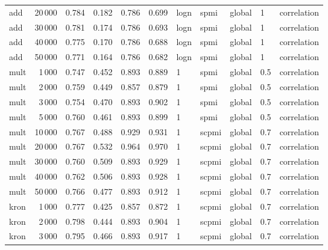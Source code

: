 \begin{tabular}{lrrrrrlllll}
     add &           20\,000 &  0.784 &  0.182 &      0.786 &          0.699 &  logn &   spmi &  global &    1 &    correlation \\
     add &           30\,000 &  0.781 &  0.174 &      0.786 &          0.693 &  logn &   spmi &  global &    1 &    correlation \\
     add &           40\,000 &  0.775 &  0.170 &      0.786 &          0.688 &  logn &   spmi &  global &    1 &    correlation \\
     add &           50\,000 &  0.771 &  0.164 &      0.786 &          0.682 &  logn &   spmi &  global &    1 &    correlation \\
    mult &            1\,000 &  0.747 &  0.452 &      0.893 &          0.889 &     1 &   spmi &  global &  0.5 &    correlation \\
    mult &            2\,000 &  0.759 &  0.449 &      0.857 &          0.879 &     1 &   spmi &  global &  0.5 &    correlation \\
    mult &            3\,000 &  0.754 &  0.470 &      0.893 &          0.902 &     1 &   spmi &  global &  0.5 &    correlation \\
    mult &            5\,000 &  0.760 &  0.461 &      0.893 &          0.899 &     1 &   spmi &  global &  0.5 &    correlation \\
    mult &           10\,000 &  0.767 &  0.488 &      0.929 &          0.931 &     1 &  scpmi &  global &  0.7 &    correlation \\
    mult &           20\,000 &  0.767 &  0.532 &      0.964 &          0.970 &     1 &  scpmi &  global &  0.7 &    correlation \\
    mult &           30\,000 &  0.760 &  0.509 &      0.893 &          0.929 &     1 &  scpmi &  global &  0.7 &    correlation \\
    mult &           40\,000 &  0.762 &  0.506 &      0.893 &          0.928 &     1 &  scpmi &  global &  0.7 &    correlation \\
    mult &           50\,000 &  0.766 &  0.477 &      0.893 &          0.912 &     1 &  scpmi &  global &  0.7 &    correlation \\
    kron &            1\,000 &  0.777 &  0.425 &      0.857 &          0.872 &     1 &  scpmi &  global &  0.7 &    correlation \\
    kron &            2\,000 &  0.798 &  0.444 &      0.893 &          0.904 &     1 &  scpmi &  global &  0.7 &    correlation \\
    kron &            3\,000 &  0.795 &  0.466 &      0.893 &          0.917 &     1 &  scpmi &  global &  0.7 &    correlation \\

\end{tabular}
